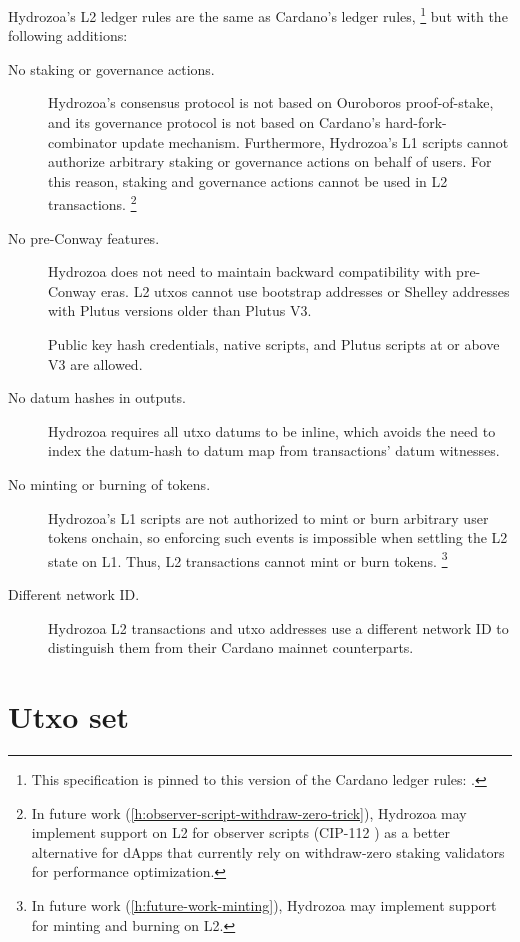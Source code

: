 \documentclass[../hydrozoa.tex]{subfiles}
\begin{document}
Hydrozoa's L2 ledger rules are the same as Cardano's ledger rules,%
\footnote{This specification is pinned to this version of the Cardano ledger rules: \citep{IntersectMBOCardanoLedgerV117402025}.}
but with the following additions:
\begin{description}
    \item[No staking or governance actions.]
      Hydrozoa's consensus protocol is not based on Ouroboros proof-of-stake, and its governance protocol is not based on Cardano's hard-fork-combinator update mechanism.
      Furthermore, Hydrozoa's L1 scripts cannot authorize arbitrary staking or governance actions on behalf of users.
      For this reason, staking and governance actions cannot be used in L2 transactions.%
      \footnote{In future work (\cref{h:observer-script-withdraw-zero-trick}), Hydrozoa may implement support on L2 for observer scripts (CIP-112 \citep{DiSarroCIP112ObserveScript2024}) as a better alternative for dApps that currently rely on withdraw-zero staking validators for performance optimization.}
    \item[No pre-Conway features.] Hydrozoa does not need to maintain backward compatibility with pre-Conway eras.
      L2 utxos cannot use bootstrap addresses or Shelley addresses with Plutus versions older than Plutus V3.

      Public key hash credentials, native scripts, and Plutus scripts at or above V3 are allowed.
    \item[No datum hashes in outputs.] Hydrozoa requires all utxo datums to be inline, which avoids the need to index the datum-hash to datum map from transactions' datum witnesses.
    \item[No minting or burning of tokens.]
      Hydrozoa's L1 scripts are not authorized to mint or burn arbitrary user tokens onchain, so enforcing such events is impossible when settling the L2 state on L1.
      Thus, L2 transactions cannot mint or burn tokens.%
      \footnote{In future work (\cref{h:future-work-minting}), Hydrozoa may implement support for minting and burning on L2.}
    \item[Different network ID.] Hydrozoa L2 transactions and utxo addresses use a different network ID to distinguish them from their Cardano mainnet counterparts.
\end{description}

\section{Utxo set}%
\label{h:l2-utxo-set}%
\end{document}

